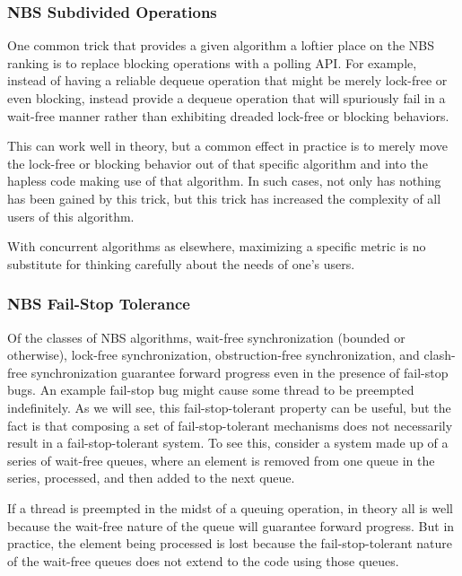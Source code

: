 \subsubsection{NBS Subdivided Operations}
\label{sec:advsync:NBS Subdivided Operations}

One common trick that provides a given algorithm a loftier place on
the NBS ranking is to replace blocking operations with a polling API\@.
For example, instead of having a reliable dequeue operation that might be
merely lock-free or even blocking, instead provide a dequeue operation
that will spuriously fail in a wait-free manner rather than exhibiting
dreaded lock-free or blocking behaviors.

This can work well in theory, but a common effect in practice is to
merely move the lock-free or blocking behavior out of that specific
algorithm and into the hapless code making use of that algorithm.
In such cases, not only has nothing has been gained by this trick, but
this trick has increased the complexity of all users of this algorithm.

With concurrent algorithms as elsewhere, maximizing a specific metric
is no substitute for thinking carefully about the needs of one's users.

\subsubsection{NBS Fail-Stop Tolerance}
\label{sec:advsync:NBS Fail-Stop Tolerance}

Of the classes of NBS algorithms, wait-free synchronization (bounded or
otherwise), lock-free synchronization, obstruction-free synchronization,
and clash-free synchronization guarantee forward progress even in the
presence of fail-stop bugs.
An example fail-stop bug might cause some thread to be preempted indefinitely.
As we will see, this fail-stop-tolerant property can be useful, but the
fact is that composing a set of fail-stop-tolerant mechanisms does not
necessarily result in a fail-stop-tolerant system.
To see this, consider a system made up of a series of wait-free queues,
where an element is removed from one queue in the series, processed,
and then added to the next queue.

If a thread is preempted in the midst of a queuing operation, in theory
all is well because the wait-free nature of the queue will guarantee
forward progress.
But in practice, the element being processed is lost because the
fail-stop-tolerant nature of the wait-free queues does not extend to
the code using those queues.

